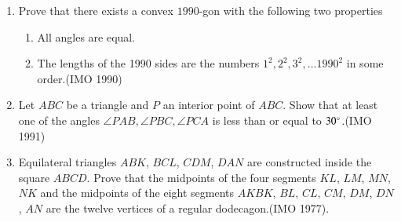\begin{enumerate}[label=\thesubsection.\arabic*,ref=\thesubsection.\theenumi]
\item Prove that there exists a convex $1990$-gon with the following     two properties
\begin{enumerate}
\item All angles are equal.
\item The lengths of the 1990 sides are the numbers $1^2, 2^2, 3^2,\dots 1990^2$ in some order.\hfill(IMO  1990)
\end{enumerate}
%
\item Let $ABC$ be a triangle and $P$ an interior point of $ABC$.     Show that at least one of the angles $\angle{PAB}, \angle{PBC}, \angle{PCA}$ is less than or equal to $30\degree$.\hfill(IMO  1991)
%
\item Equilateral triangles $ABK$, $BCL$, $CDM$, $DAN$ are constructed inside the square $ABCD$. Prove that the midpoints of the four segments $KL$, $LM$, $MN$, $NK$ and the midpoints of the eight segments $AKBK$, $BL$, $CL$, $CM$, $DM$, $DN$, $AN$ are the twelve vertices of a regular dodecagon.\hfill(IMO  1977).



\end{enumerate}
